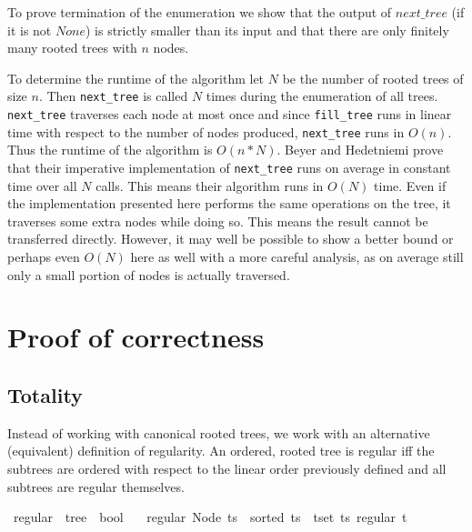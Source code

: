 To prove termination of the enumeration we show that the output of $next\_tree$ (if it is not $None$) is strictly smaller than its input and that there are only finitely many rooted trees with $n$ nodes.

To determine the runtime of the algorithm let $N$ be the number of rooted trees of size $n$.
Then \texttt{next\_tree} is called $N$ times during the enumeration of all trees.
\texttt{next\_tree} traverses each node at most once and since \texttt{fill\_tree} runs in linear time with respect to the number of nodes produced, \texttt{next\_tree} runs in $O(n)$.
Thus the runtime of the algorithm is $O(n * N)$.
Beyer and Hedetniemi \parencite{beyer} prove that their imperative implementation of \texttt{next\_tree} runs on average in constant time over all $N$ calls.
This means their algorithm runs in $O(N)$ time.
Even if the implementation presented here performs the same operations on the tree, it traverses some extra nodes while doing so.
This means the result cannot be transferred directly.
However, it may well be possible to show a better bound or perhaps even $O(N)$ here as well with a more careful analysis, as on average still only a small portion of nodes is actually traversed.

\section{Proof of correctness}

\subsection{Totality}

Instead of working with canonical rooted trees, we work with an alternative (equivalent) definition of regularity.
An ordered, rooted tree is regular iff the subtrees are ordered with respect to the linear order previously defined and all subtrees are regular themselves.

\begin{isabellebox}
    \isamarkupfalse%
    \ regular\ {\isacharcolon}{\kern0pt}{\isacharcolon}{\kern0pt}\ {\isachardoublequoteopen}tree\ {\isasymRightarrow}\ bool{\isachardoublequoteclose}\ \isanewline
    \ \ {\isachardoublequoteopen}regular\ {\isacharparenleft}{\kern0pt}Node\ ts{\isacharparenright}{\kern0pt}\ {\isasymlongleftrightarrow}\ sorted\ ts\ {\isasymand}\ {\isacharparenleft}{\kern0pt}{\isasymforall}t{\isasymin}set\ ts{\isachardot}{\kern0pt}\ regular\ t{\isacharparenright}{\kern0pt}{\isachardoublequoteclose}
\end{isabellebox}

